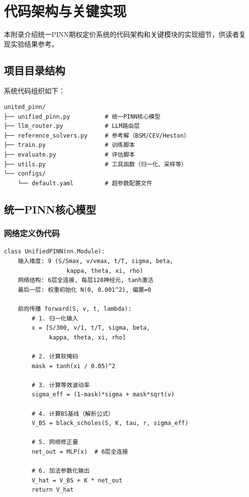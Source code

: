 \chapter{代码架构与关键实现}\label{app:code}

本附录介绍统一PINN期权定价系统的代码架构和关键模块的实现细节，供读者复现实验结果参考。

\section{项目目录结构}

系统代码组织如下：

\begin{verbatim}
united_pinn/
├── unified_pinn.py          # 统一PINN核心模型
├── llm_router.py            # LLM路由层
├── reference_solvers.py     # 参考解（BSM/CEV/Heston）
├── train.py                 # 训练脚本
├── evaluate.py              # 评估脚本
├── utils.py                 # 工具函数（归一化、采样等）
└── configs/
    └── default.yaml         # 超参数配置文件
\end{verbatim}

\section{统一PINN核心模型}

\subsection{网络定义伪代码}

\begin{verbatim}
class UnifiedPINN(nn.Module):
    输入维度: 9 (S/Smax, v/vmax, t/T, sigma, beta,
                  kappa, theta, xi, rho)
    网络结构: 6层全连接, 每层128神经元, tanh激活
    最后一层: 权重初始化 N(0, 0.001^2), 偏置=0

    前向传播 forward(S, v, t, lambda):
        # 1. 归一化输入
        x = [S/300, v/1, t/T, sigma, beta,
             kappa, theta, xi, rho]

        # 2. 计算软掩码
        mask = tanh(xi / 0.05)^2

        # 3. 计算等效波动率
        sigma_eff = (1-mask)*sigma + mask*sqrt(v)

        # 4. 计算BS基线（解析公式）
        V_BS = black_scholes(S, K, tau, r, sigma_eff)

        # 5. 网络修正量
        net_out = MLP(x)  # 6层全连接

        # 6. 加法参数化输出
        V_hat = V_BS + K * net_out
        return V_hat
\end{verbatim}

